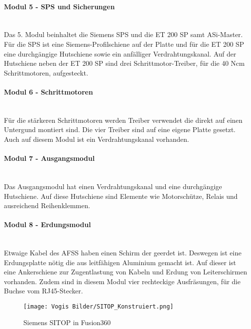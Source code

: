    \paragraph{Modul 5 - SPS und Sicherungen}\mbox{}\\
    Das 5. Modul beinhaltet die Siemens SPS und die ET 200 SP samt ASi-Master. Für die SPS ist eine Siemens-Profilschiene auf der Platte und für die ET 200 SP eine durchgängige Hutschiene sowie ein anfälliger Verdrahtungskanal. Auf der Hutschiene neben der ET 200 SP sind drei Schrittmotor-Treiber, für die 40 Ncm Schrittmotoren, aufgesteckt.
    \paragraph{Modul 6 - Schrittmotoren}\mbox{}\\
    Für die stärkeren Schrittmotoren werden Treiber verwendet die direkt auf einen Untergund montiert sind. Die vier Treiber sind auf eine eigene Platte gesetzt. Auch auf diesem Modul ist ein Verdrahtungskanal vorhanden.
    \paragraph{Modul 7 - Ausgangsmodul}\mbox{}\\
    Das Ausgangsmodul hat einen Verdrahtungskanal und eine durchgängige Hutschiene. Auf diese Hutschiene sind Elemente wie Motorschütze, Relais und ausreichend Reihenklemmen.
    \paragraph{Modul 8 - Erdungsmodul}\mbox{}\\
    Etwaige Kabel des AFSS haben einen Schirm der geerdet ist. Deswegen ist eine Erdungsplatte nötig die aus leitfähigen Aluminium gemacht ist. Auf dieser ist eine Ankerschiene zur Zugentlastung von Kabeln und Erdung von Leiterschirmen vorhanden. Zudem sind in diesem Modul vier rechteckige Ausfräsungen, für die Buchse vom RJ45-Stecker.
    \begin{figure}[h]
        \centering
        \texttt{[image: Vogis Bilder/SITOP\_Konstruiert.png]}
        \caption{Siemens SITOP in Fusion360}
        \label{fig:SITOP_Konstrueiert}
    \end{figure}
